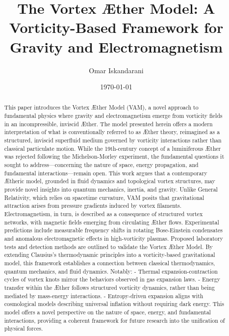 \documentclass[a4paper,10pt]{article}
\title{The Vortex \AE ther Model: A Vorticity-Based Framework for Gravity and Electromagnetism}
\author{Omar Iskandarani}
\date{\today}
\begin{document}
    \maketitle

    \maketitle

    \begin{abstract}
        This paper introduces the Vortex \AE ther Model (VAM), a novel approach to fundamental physics where gravity and electromagnetism emerge from vorticity fields in an incompressible, inviscid \AE ther. The model presented herein offers a modern interpretation of what is conventionally referred to as \AE ther theory, reimagined as a structured, inviscid superfluid medium governed by vorticity interactions rather than classical particulate motion. While the 19th-century concept of a luminiferous \AE ther was rejected following the Michelson-Morley experiment, the fundamental questions it sought to address—concerning the nature of space, energy propagation, and fundamental interactions—remain open. This work argues that a contemporary \AE theric model, grounded in fluid dynamics and topological vortex structures, may provide novel insights into quantum mechanics, inertia, and gravity.        Unlike General Relativity, which relies on spacetime curvature, VAM posits that gravitational attraction arises from pressure gradients induced by vortex filaments. Electromagnetism, in turn, is described as a consequence of structured vortex networks, with magnetic fields emerging from circulating \AE ther flows. Experimental predictions include measurable frequency shifts in rotating Bose-Einstein condensates and anomalous electromagnetic effects in high-vorticity plasmas. Proposed laboratory tests and detection methods are outlined to validate the Vortex \AE ther Model.        By extending Clausius’s thermodynamic principles into a vorticity-based gravitational model, this framework establishes a connection between classical thermodynamics, quantum mechanics, and fluid dynamics. Notably:        - Thermal expansion-contraction cycles of vortex knots mirror the behaviors observed in gas expansion laws.        - Energy transfer within the \AE ther follows structured vorticity dynamics, rather than being mediated by mass-energy interactions.        - Entropy-driven expansion aligns with cosmological models describing universal inflation without requiring dark energy.        This model offers a novel perspective on the nature of space, energy, and fundamental interactions, providing a coherent framework for future research into the unification of physical forces.
    \end{abstract}
\end{document}
